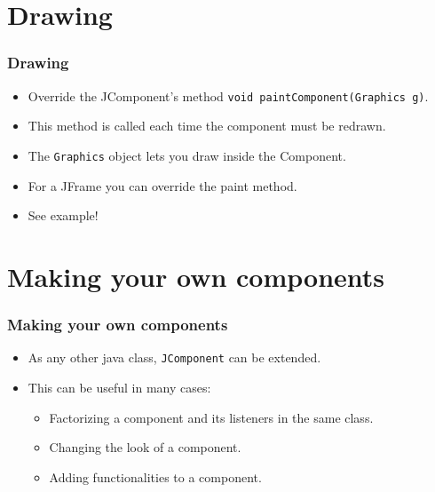 \documentclass[10pt, handout]{beamer}
\begin{document}
\section{Drawing}
\begin{frame}
  \frametitle{Drawing}
  \begin{itemize}
    \item Override the JComponent's method \verb!void paintComponent(Graphics g)!.
    \item This method is called each time the component must be redrawn.
    \item The \verb!Graphics! object lets you draw inside the Component.
    \item For a JFrame you can override the paint method.
    \item See example!
  \end{itemize}
\end{frame}

\section{Making your own components}
\begin{frame}
  \frametitle{Making your own components}
  \begin{itemize}
    \item As any other java class, \verb!JComponent! can be extended.
    \item This can be useful in many cases:
      \begin{itemize}
        \item Factorizing a component and its listeners in the same class.
        \item Changing the look of a component.
        \item Adding functionalities to a component.
      \end{itemize}
  \end{itemize}
\end{frame}
\end{document}
